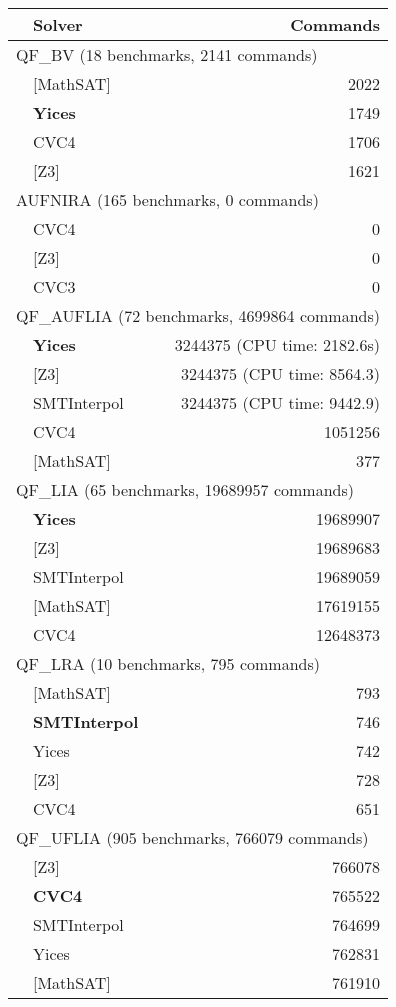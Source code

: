 \begin{tabular}{|p{.1in}l|r|}
\hline
 & Solver & Commands \\
\hline
\hline
\multicolumn{3}{|l|}{QF\_BV (18 benchmarks, 2141 commands)} \\
\hline
& [MathSAT] & 2022 \\
& \textbf{Yices} & 1749 \\
& CVC4 & 1706 \\
& [Z3] & 1621 \\
\hline
\hline
\multicolumn{3}{|l|}{AUFNIRA (165 benchmarks, 0 commands)} \\
\hline
& CVC4 & 0 \\
& [Z3] & 0 \\
& CVC3 & 0 \\
\hline
\hline
\multicolumn{3}{|l|}{QF\_AUFLIA (72 benchmarks, 4699864 commands)} \\
\hline
& \textbf{Yices} & 3244375 (CPU time: 2182.6s)\\
& [Z3] & 3244375 (CPU time: 8564.3) \\
& SMTInterpol & 3244375 (CPU time: 9442.9) \\
& CVC4 & 1051256 \\
& [MathSAT] & 377 \\
\hline
\hline
\multicolumn{3}{|l|}{QF\_LIA (65 benchmarks, 19689957 commands)} \\
\hline
& \textbf{Yices} & 19689907\\
& [Z3] & 19689683 \\
& SMTInterpol & 19689059 \\
& [MathSAT] & 17619155 \\
& CVC4 & 12648373 \\
\hline
\hline
\multicolumn{3}{|l|}{QF\_LRA (10 benchmarks, 795 commands)} \\
\hline
& [MathSAT] & 793 \\
& \textbf{SMTInterpol} & 746 \\
& Yices & 742 \\
& [Z3] & 728 \\
& CVC4 & 651 \\
\hline
\hline
\multicolumn{3}{|l|}{QF\_UFLIA (905 benchmarks, 766079 commands)} \\
\hline
& [Z3] & 766078 \\
& \textbf{CVC4} & 765522 \\
& SMTInterpol & 764699 \\
& Yices & 762831 \\
& [MathSAT] & 761910 \\

\end{tabular}
